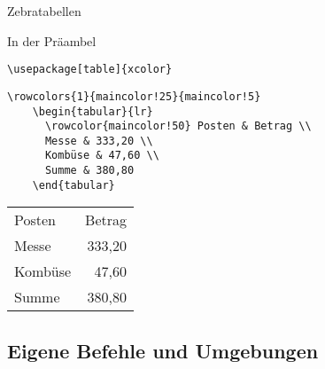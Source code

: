 \begin{Frame}[fragile]{Zebratabellen}
  \begin{Block}{In der Präambel}
    \begin{lstlisting}[gobble=6,style=block]
      \usepackage[table]{xcolor}
    \end{lstlisting}
  \end{Block}

  \begin{lstlisting}[gobble=4]
    \rowcolors{1}{maincolor!25}{maincolor!5}
    \begin{tabular}{lr}
      \rowcolor{maincolor!50} Posten & Betrag \\
      Messe & 333,20 \\
      Kombüse & 47,60 \\
      Summe & 380,80
    \end{tabular}
  \end{lstlisting}

  \begin{center}
    \begin{tabular}{lr}
      \rowcolor{maincolor!50} Posten & Betrag \\
      Messe & 333,20 \\
      Kombüse & 47,60 \\
      Summe & 380,80
    \end{tabular}
  \end{center}
\end{Frame}

\subsection{Eigene Befehle und Umgebungen}

